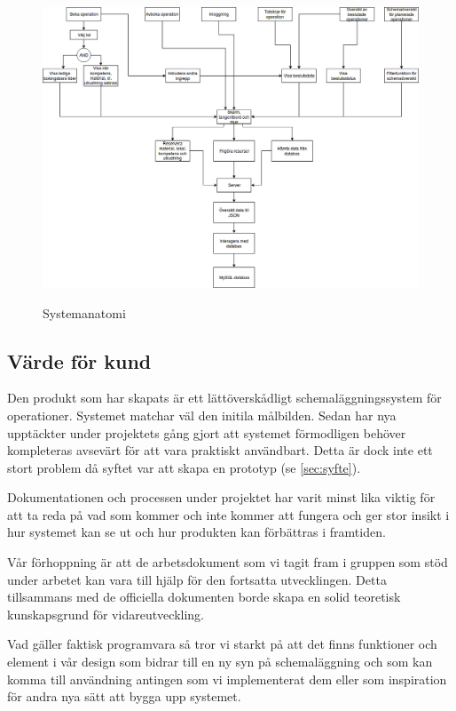 \begin{figure}[H]
    \includegraphics[width=\textwidth,height=.4\textheight]{Figures/Systemanatomi.png}\\
    \caption{Systemanatomi}
    \label{fig:Systemanatomi}
\end{figure}

\subsection{Värde för kund}
Den produkt som har skapats är ett lättöverskådligt schemaläggningssystem för operationer. Systemet matchar väl den initila målbilden. Sedan har nya upptäckter under projektets gång gjort att systemet förmodligen behöver kompleteras avsevärt för att vara praktiskt användbart. Detta är dock inte ett stort problem då syftet var att skapa en prototyp (se \ref{sec:syfte}).

Dokumentationen och processen under projektet har varit minst lika viktig för att ta reda på vad som kommer och inte kommer att fungera och ger stor insikt i hur systemet kan se ut och hur produkten kan förbättras i framtiden.

Vår förhoppning är att de arbetsdokument som vi tagit fram i gruppen som stöd under arbetet kan vara till hjälp för den fortsatta utvecklingen. Detta tillsammans med de officiella dokumenten borde skapa en solid teoretisk kunskapsgrund för vidareutveckling.

Vad gäller faktisk programvara så tror vi starkt på att det finns funktioner och element i vår design som bidrar till en ny syn på schemaläggning och som kan komma till användning antingen som vi implementerat dem eller som inspiration för andra nya sätt att bygga upp systemet.

